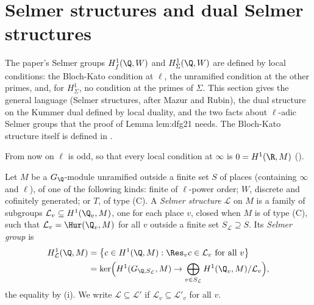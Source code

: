 \section{Selmer structures and dual Selmer structures}\label{sec:galcoh:structures}

The paper's Selmer groups $H^1_f(\Q,W)$ and $H^1_\Sigma(\Q,W)$ are defined by local conditions: the Bloch-Kato condition at $\ell$, the unramified condition at the
other primes, and, for $H^1_\Sigma$, no condition at the primes of $\Sigma$. This section gives the general language (Selmer structures, after Mazur and Rubin), the
dual structure on the Kummer dual defined by local duality, and the two facts about $\ell$-adic Selmer groups that the proof of Lemma lem:dfg21 needs. The
Bloch-Kato structure itself is defined in .

From now on $\ell$ is odd, so that every local condition at $\infty$ is $0=H^1(\R,M)$ ().

\begin{definition}\label{def:galcoh:selmer-structure}
Let $M$ be a $G_\Q$-module unramified outside a finite set $S$ of places (containing $\infty$ and $\ell$), of one of the following kinds: finite of $\ell$-power order; $W$,
discrete and cofinitely generated; or $T$, of type (C). A \emph{Selmer structure} $\mathcal L$ on $M$ is a family of subgroups $\mathcal L_v\subseteq H^1(\Q_v,M)$, one for each place
$v$, closed when $M$ is of type (C), such that $\mathcal L_v=\Hur(\Q_v,M)$ for all $v$ outside a finite set $S_{\mathcal L}\supseteq S$. Its \emph{Selmer group} is
\begin{align*}
H^1_{\mathcal L}(\Q,M)&=\bigl\{c\in H^1(\Q,M):\Res_vc\in\mathcal L_v\text{ for all }v\bigr\}\\
&=\ker\Bigl(H^1(G_{\Q,S_{\mathcal L}},M)\to\bigoplus_{v\in S_{\mathcal L}}H^1(\Q_v,M)/\mathcal L_v\Bigr),
\end{align*}
the equality by (i). We write $\mathcal L\subseteq\mathcal L'$ if $\mathcal L_v\subseteq\mathcal L'_v$ for all $v$.
\end{definition}

